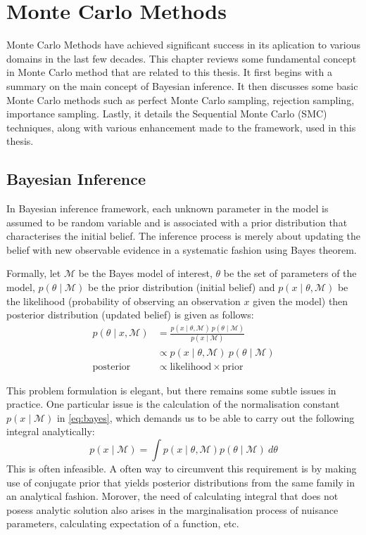 \chapter{Monte Carlo Methods}
\graphicspath{{Chapter2/figures/}}
\label{ch:mcmethods}
Monte Carlo Methods have achieved significant success in its aplication to various domains in the last few decades. This chapter reviews some fundamental concept in Monte Carlo method that are related to this thesis. It first begins with a summary on the main concept of Bayesian inference. It then discusses some  basic Monte Carlo methods such as perfect Monte Carlo sampling, rejection sampling, importance sampling. Lastly, it details the Sequential Monte Carlo (SMC) techniques, along with various enhancement made to the framework, used in this thesis.

\section{Bayesian Inference}
In Bayesian inference framework, each unknown parameter in the model is assumed to be random variable and is associated with a prior distribution that characterises the initial belief. The inference process is merely about updating the belief with new observable evidence in a systematic fashion using Bayes theorem.

Formally, let $\mathcal{M}$ be the Bayes model of interest, $\theta$ be the set of parameters of the model, $p\left(\theta \mid \mathcal{M}\right)$ be the prior distribution (initial belief) and $p(x \mid \theta, \mathcal{M})$ be the likelihood (probability of observing an observation $x$ given the model) then posterior distribution (updated belief) is given as follows:  
\begin{align}
  p(\theta \mid x , \mathcal{M}) &= \frac{p(x \mid \theta , \mathcal{M})~p(\theta \mid \mathcal{M})}{p(x \mid \mathcal{M})} \nonumber \\
                   &\propto p(x \mid \theta , \mathcal{M})~p(\theta \mid \mathcal{M}) \label{eq:bayes} \\
  \text{posterior} &\propto \text{likelihood} \times \text{prior}
\end{align}

This problem formulation is elegant, but there remains some subtle issues in practice. One particular issue is the calculation of the normalisation constant $p(x \mid \mathcal{M})$ in \eqref{eq:bayes}, which demands us to be able to carry out the following integral  analytically:
\begin{equation}
  p(x \mid \mathcal{M}) = \int p(x \mid \theta, \mathcal{M}) p(\theta \mid \mathcal{M})~d\theta
\end{equation}
This is often infeasible. A often way to circumvent this requirement is by making use of conjugate prior that yields posterior distributions from the same family in an analytical fashion. Morover, the need of calculating integral that does not posess analytic solution also arises in the marginalisation process of nuisance parameters, calculating expectation of a function, etc.


